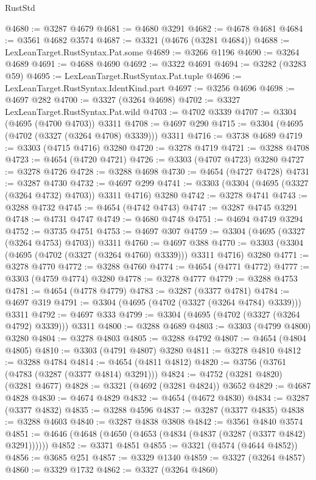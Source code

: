 \begin{lexlean}{RustStd}
\begin{coremodule}
@4680 := @3287 @4679
@4681 := @4680 @3291
@4682 := @4678 @4681
@4684 := @3561 @4682 @3574
@4687 := @3321 (@4676 (@3281 @4684))
@4688 := LexLeanTarget.RustSyntax.Pat.some
@4689 := @3266 @1196
@4690 := @3264 @4689
@4691 := @4688 @4690
@4692 := @3322 @4691
@4694 := @3282 (@3283 @59)
@4695 := LexLeanTarget.RustSyntax.Pat.tuple
@4696 := LexLeanTarget.RustSyntax.IdentKind.part
@4697 := @3256 @4696
@4698 := @4697 @282
@4700 := @3327 (@3264 @4698)
@4702 := @3327 LexLeanTarget.RustSyntax.Pat.wild
@4703 := @4702 @3339
@4707 := @3304 (@4695 (@4700 @4703)) @3311
@4708 := @4697 @290
@4715 := @3304 (@4695 (@4702 (@3327 (@3264 @4708) @3339))) @3311
@4716 := @3738 @4689
@4719 := @3303 (@4715 @4716) @3280
@4720 := @3278 @4719
@4721 := @3288 @4708
@4723 := @4654 (@4720 @4721)
@4726 := @3303 (@4707 @4723) @3280
@4727 := @3278 @4726
@4728 := @3288 @4698
@4730 := @4654 (@4727 @4728)
@4731 := @3287 @4730
@4732 := @4697 @299
@4741 := @3303 (@3304 (@4695 (@3327 (@3264 @4732) @4703)) @3311 @4716) @3280
@4742 := @3278 @4741
@4743 := @3288 @4732
@4745 := @4654 (@4742 @4743)
@4747 := @3287 @4745 @3291
@4748 := @4731 @4747
@4749 := @4680 @4748
@4751 := @4694 @4749 @3294
@4752 := @3735 @4751
@4753 := @4697 @307
@4759 := @3304 (@4695 (@3327 (@3264 @4753) @4703)) @3311
@4760 := @4697 @388
@4770 := @3303 (@3304 (@4695 (@4702 (@3327 (@3264 @4760) @3339))) @3311 @4716) @3280
@4771 := @3278 @4770
@4772 := @3288 @4760
@4774 := @4654 (@4771 @4772)
@4777 := @3303 (@4759 @4774) @3280
@4778 := @3278 @4777
@4779 := @3288 @4753
@4781 := @4654 (@4778 @4779)
@4783 := @3287 (@3377 @4781)
@4784 := @4697 @319
@4791 := @3304 (@4695 (@4702 (@3327 (@3264 @4784) @3339))) @3311
@4792 := @4697 @333
@4799 := @3304 (@4695 (@4702 (@3327 (@3264 @4792) @3339))) @3311
@4800 := @3288 @4689
@4803 := @3303 (@4799 @4800) @3280
@4804 := @3278 @4803
@4805 := @3288 @4792
@4807 := @4654 (@4804 @4805)
@4810 := @3303 (@4791 @4807) @3280
@4811 := @3278 @4810
@4812 := @3288 @4784
@4814 := @4654 (@4811 @4812)
@4820 := @3756 (@3761 (@4783 (@3287 (@3377 @4814) @3291)))
@4824 := @4752 (@3281 @4820) (@3281 @4677)
@4828 := @3321 (@4692 (@3281 @4824)) @3652
@4829 := @4687 @4828
@4830 := @4674 @4829
@4832 := @4654 (@4672 @4830)
@4834 := @3287 (@3377 @4832)
@4835 := @3288 @4596
@4837 := @3287 (@3377 @4835)
@4838 := @3288 @4603
@4840 := @3287 @4838 @3808
@4842 := @3561 @4840 @3574
@4851 := @4646 (@4648 (@4650 (@4653 (@4834 (@4837 (@3287 (@3377 @4842) @3291))))))
@4852 := @3371 @4851
@4855 := @3321 (@4574 (@4644 @4852))
@4856 := @3685 @251
@4857 := @3329 @1340
@4859 := @3327 (@3264 @4857)
@4860 := @3329 @1732
@4862 := @3327 (@3264 @4860)

\end{coremodule}
\end{lexlean}

